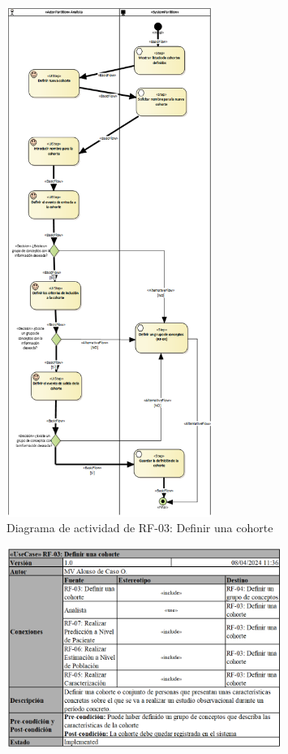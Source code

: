 \begin{figure}[H]
    \centering
    \includegraphics[width=0.60\textwidth]{figures/FR03.png}
    \caption{Diagrama de actividad de RF-03: Definir una cohorte}
    \label{fig:FR03}
\end{figure}

\begin{figure}[H]
    \centering
    \includegraphics[width=0.80\textwidth]{tables/RF03tab.png}
    \label{table:RF03tab}
\end{figure}

